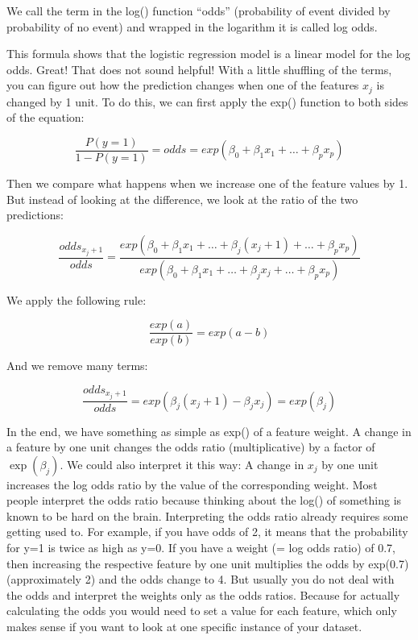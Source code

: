 \documentclass[12pt,]{krantz}
\begin{document}
We call the term in the log() function ``odds'' (probability of event
divided by probability of no event) and wrapped in the logarithm it is
called log odds.

This formula shows that the logistic regression model is a linear model
for the log odds. Great! That does not sound helpful! With a little
shuffling of the terms, you can figure out how the prediction changes
when one of the features \(x_j\) is changed by 1 unit. To do this, we
can first apply the exp() function to both sides of the equation:

\[\frac{P(y=1)}{1-P(y=1)}=odds=exp\left(\beta_{0}+\beta_{1}x_{1}+\ldots+\beta_{p}x_{p}\right)\]

Then we compare what happens when we increase one of the feature values
by 1. But instead of looking at the difference, we look at the ratio of
the two predictions:

\[\frac{odds_{x_j+1}}{odds}=\frac{exp\left(\beta_{0}+\beta_{1}x_{1}+\ldots+\beta_{j}(x_{j}+1)+\ldots+\beta_{p}x_{p}\right)}{exp\left(\beta_{0}+\beta_{1}x_{1}+\ldots+\beta_{j}x_{j}+\ldots+\beta_{p}x_{p}\right)}\]

We apply the following rule:

\[\frac{exp(a)}{exp(b)}=exp(a-b)\]

And we remove many terms:

\[\frac{odds_{x_j+1}}{odds}=exp\left(\beta_{j}(x_{j}+1)-\beta_{j}x_{j}\right)=exp\left(\beta_j\right)\]

In the end, we have something as simple as exp() of a feature weight. A
change in a feature by one unit changes the odds ratio (multiplicative)
by a factor of \(\exp(\beta_j)\). We could also interpret it this way: A
change in \(x_j\) by one unit increases the log odds ratio by the value
of the corresponding weight. Most people interpret the odds ratio
because thinking about the log() of something is known to be hard on the
brain. Interpreting the odds ratio already requires some getting used
to. For example, if you have odds of 2, it means that the probability
for y=1 is twice as high as y=0. If you have a weight (= log odds ratio)
of 0.7, then increasing the respective feature by one unit multiplies
the odds by exp(0.7) (approximately 2) and the odds change to 4. But
usually you do not deal with the odds and interpret the weights only as
the odds ratios. Because for actually calculating the odds you would
need to set a value for each feature, which only makes sense if you want
to look at one specific instance of your dataset.
\end{document}
